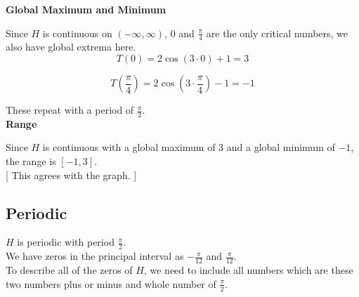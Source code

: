 \documentclass{ximera}
\begin{document}
\textbf{\textcolor{blue!55!black}{Global Maximum and Minimum}}


Since $H$ is continuous on $(-\infty, \infty)$, $0$ and $\frac{\pi}{4}$ are the only critical numbers, we also have global extrema here. \\





\[
T\left(0 \right) = 2 \cos\left(3 \cdot 0 \right) + 1 = 3
\]




\[
T\left( \frac{\pi}{4} \right) = 2 \cos\left(3 \cdot \frac{\pi}{4} \right) - 1 = -1
\]





These repeat with a period of $\frac{\pi}{2}$. \\











\textbf{\textcolor{blue!55!black}{Range}}


Since $H$ is continuous with a global maximum of $3$ and a global minimum of $-1$, the range is $[-1, 3]$.  \\ 



[ This agrees with the graph. ]


























\subsection*{Periodic}

$H$ is periodic with period $\frac{\pi}{2}$. \\



We have zeros in the principal interval as $-\frac{\pi}{12}$ and $\frac{\pi}{12}$. \\


To describe all of the zeros of $H$, we need to include all numbers which are these two numbers plus or minus and whole number of $\frac{\pi}{2}$. \\
\end{document}
